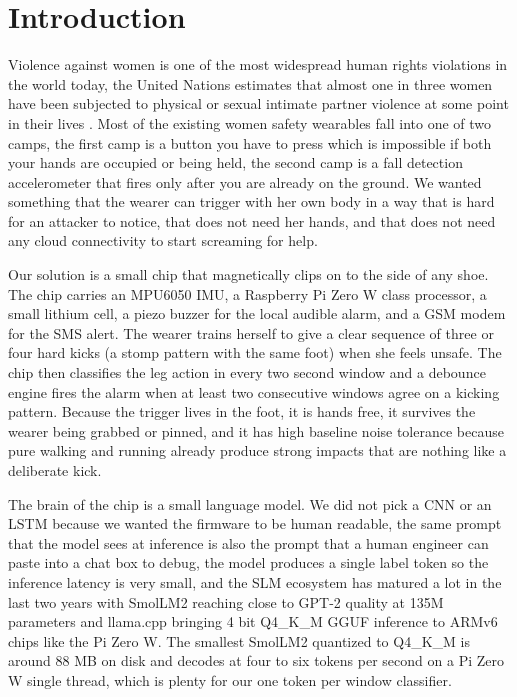 \documentclass[conference]{IEEEtran}
\begin{document}
\section{Introduction}
Violence against women is one of the most widespread human rights violations in the world today, the United Nations estimates that almost one in three women have been subjected to physical or sexual intimate partner violence at some point in their lives \cite{unwomen2023facts}. Most of the existing women safety wearables fall into one of two camps, the first camp is a button you have to press which is impossible if both your hands are occupied or being held, the second camp is a fall detection accelerometer that fires only after you are already on the ground. We wanted something that the wearer can trigger with her own body in a way that is hard for an attacker to notice, that does not need her hands, and that does not need any cloud connectivity to start screaming for help.

Our solution is a small chip that magnetically clips on to the side of any shoe. The chip carries an MPU6050 IMU, a Raspberry Pi Zero W class processor, a small lithium cell, a piezo buzzer for the local audible alarm, and a GSM modem for the SMS alert. The wearer trains herself to give a clear sequence of three or four hard kicks (a stomp pattern with the same foot) when she feels unsafe. The chip then classifies the leg action in every two second window and a debounce engine fires the alarm when at least two consecutive windows agree on a kicking pattern. Because the trigger lives in the foot, it is hands free, it survives the wearer being grabbed or pinned, and it has high baseline noise tolerance because pure walking and running already produce strong impacts that are nothing like a deliberate kick.

The brain of the chip is a small language model. We did not pick a CNN or an LSTM because we wanted the firmware to be human readable, the same prompt that the model sees at inference is also the prompt that a human engineer can paste into a chat box to debug, the model produces a single label token so the inference latency is very small, and the SLM ecosystem has matured a lot in the last two years with SmolLM2 \cite{allal2025smollm2} reaching close to GPT-2 quality at 135M parameters and llama.cpp \cite{gerganov2024llamacpp} bringing 4 bit Q4\_K\_M GGUF inference to ARMv6 chips like the Pi Zero W. The smallest SmolLM2 quantized to Q4\_K\_M is around 88 MB on disk and decodes at four to six tokens per second on a Pi Zero W single thread, which is plenty for our one token per window classifier.
\end{document}
